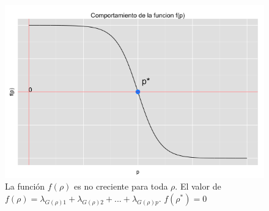 \begin{figure}[!ht]\label{Fig1.3}
  \centering
	\includegraphics[width=1\textwidth]{Figures/Chapter2_fp}	
  \caption[Comportamiento de $f(\rho)$.]
  {La función $f(\rho)$ es no creciente para toda $\rho$. El valor de $f(\rho) = \lambda_{G(\rho)1}+ \lambda_{G(\rho)2} + ... +\lambda_{G(\rho)p}.$ $f(\rho^*) = 0 $}
\end{figure}


